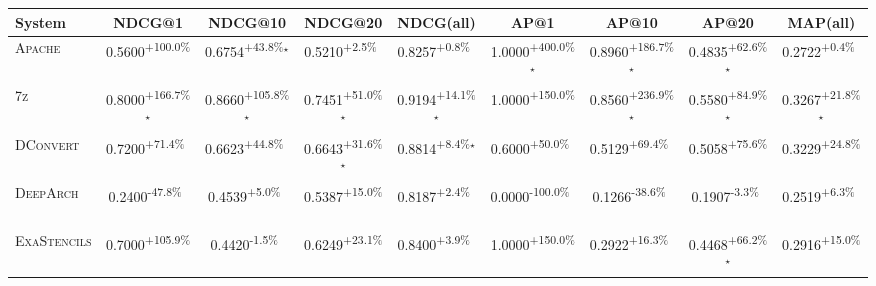 \begin{table}[htbp]
\centering
\renewcommand{\arraystretch}{1.2}
\begin{tabular}{l|cccc|cccc}
\hline
System & NDCG@1 & NDCG@10 & NDCG@20 & NDCG(all) & AP@1 & AP@10 & AP@20 & MAP(all) \\ \hline
\textsc{Apache} & \cellcolor{green!30}0.5600\textsuperscript{+100.0\%}$^{\,\,\,}$ & \cellcolor{green!30}0.6754\textsuperscript{+43.8\%}$^\star$ & \cellcolor{green!30}0.5210\textsuperscript{+2.5\%}$^{\,\,\,}$ & \cellcolor{green!30}0.8257\textsuperscript{+0.8\%}$^{\,\,\,}$ & \cellcolor{green!30}1.0000\textsuperscript{+400.0\%}$^\star$ & \cellcolor{green!30}0.8960\textsuperscript{+186.7\%}$^\star$ & \cellcolor{green!30}0.4835\textsuperscript{+62.6\%}$^\star$ & \cellcolor{green!30}0.2722\textsuperscript{+0.4\%}$^{\,\,\,}$ \\
\textsc{7z} & \cellcolor{green!30}0.8000\textsuperscript{+166.7\%}$^\star$ & \cellcolor{green!30}0.8660\textsuperscript{+105.8\%}$^\star$ & \cellcolor{green!30}0.7451\textsuperscript{+51.0\%}$^\star$ & \cellcolor{green!30}0.9194\textsuperscript{+14.1\%}$^\star$ & \cellcolor{green!30}1.0000\textsuperscript{+150.0\%}$^{\,\,\,}$ & \cellcolor{green!30}0.8560\textsuperscript{+236.9\%}$^\star$ & \cellcolor{green!30}0.5580\textsuperscript{+84.9\%}$^\star$ & \cellcolor{green!30}0.3267\textsuperscript{+21.8\%}$^\star$ \\
\textsc{DConvert} & \cellcolor{green!30}0.7200\textsuperscript{+71.4\%}$^{\,\,\,}$ & \cellcolor{green!30}0.6623\textsuperscript{+44.8\%}$^{\,\,\,}$ & \cellcolor{green!30}0.6643\textsuperscript{+31.6\%}$^\star$ & \cellcolor{green!30}0.8814\textsuperscript{+8.4\%}$^\star$ & \cellcolor{green!30}0.6000\textsuperscript{+50.0\%}$^{\,\,\,}$ & \cellcolor{green!30}0.5129\textsuperscript{+69.4\%}$^{\,\,\,}$ & \cellcolor{green!30}0.5058\textsuperscript{+75.6\%}$^{\,\,\,}$ & \cellcolor{green!30}0.3229\textsuperscript{+24.8\%}$^{\,\,\,}$ \\
\textsc{DeepArch} & \cellcolor{red!30}0.2400\textsuperscript{-47.8\%}$^{\,\,\,}$ & \cellcolor{green!30}0.4539\textsuperscript{+5.0\%}$^{\,\,\,}$ & \cellcolor{green!30}0.5387\textsuperscript{+15.0\%}$^{\,\,\,}$ & \cellcolor{green!30}0.8187\textsuperscript{+2.4\%}$^{\,\,\,}$ & \cellcolor{red!30}0.0000\textsuperscript{-100.0\%}$^{\,\,\,}$ & \cellcolor{red!30}0.1266\textsuperscript{-38.6\%}$^{\,\,\,}$ & \cellcolor{red!30}0.1907\textsuperscript{-3.3\%}$^{\,\,\,}$ & \cellcolor{green!30}0.2519\textsuperscript{+6.3\%}$^{\,\,\,}$ \\
\textsc{ExaStencils} & \cellcolor{green!30}0.7000\textsuperscript{+105.9\%}$^{\,\,\,}$ & \cellcolor{red!30}0.4420\textsuperscript{-1.5\%}$^{\,\,\,}$ & \cellcolor{green!30}0.6249\textsuperscript{+23.1\%}$^{\,\,\,}$ & \cellcolor{green!30}0.8400\textsuperscript{+3.9\%}$^{\,\,\,}$ & \cellcolor{green!30}1.0000\textsuperscript{+150.0\%}$^{\,\,\,}$ & \cellcolor{green!30}0.2922\textsuperscript{+16.3\%}$^{\,\,\,}$ & \cellcolor{green!30}0.4468\textsuperscript{+66.2\%}$^\star$ & \cellcolor{green!30}0.2916\textsuperscript{+15.0\%}$^{\,\,\,}$ \\

\end{tabular}
\end{table}
